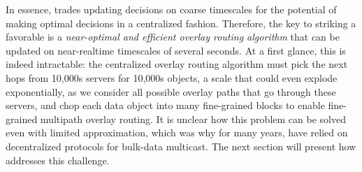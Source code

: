 In essence, \name trades updating decisions on coarse timescales
for the potential of making optimal decisions in a centralized
fashion.
Therefore, the key to striking a favorable is a
{\em near-optimal and efficient overlay routing
algorithm} that can be updated on near-realtime timescales of
several seconds.
At a first glance, this is indeed intractable:
the centralized overlay routing algorithm must pick the next hops
from 10,000s servers for 10,000s objects, a scale that could
even explode exponentially, as we consider all possible
overlay paths that go through these servers, and chop each data
object into many fine-grained blocks to enable fine-grained
multipath overlay routing.
It is unclear how this problem can be solved even with
limited approximation, which was why for many years, \company have
relied on decentralized protocols for bulk-data multicast.
The next section  will present how \name addresses this
challenge.


%
%
%
%
%
%



